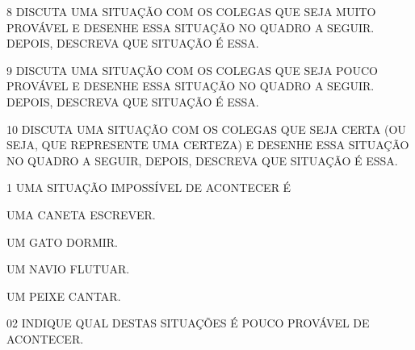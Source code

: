 \num{8} DISCUTA UMA SITUAÇÃO COM OS COLEGAS QUE SEJA MUITO PROVÁVEL E DESENHE
ESSA SITUAÇÃO NO QUADRO A SEGUIR. DEPOIS, DESCREVA QUE SITUAÇÃO É ESSA.



\num{9} DISCUTA UMA SITUAÇÃO COM OS COLEGAS QUE SEJA POUCO PROVÁVEL E DESENHE
ESSA SITUAÇÃO NO QUADRO A SEGUIR. DEPOIS, DESCREVA QUE SITUAÇÃO É ESSA.



\num{10} DISCUTA UMA SITUAÇÃO COM OS COLEGAS QUE SEJA CERTA (OU SEJA, QUE REPRESENTE UMA CERTEZA) E DESENHE ESSA SITUAÇÃO NO QUADRO A SEGUIR, DEPOIS, DESCREVA QUE SITUAÇÃO É ESSA.



\num{1} UMA SITUAÇÃO IMPOSSÍVEL DE ACONTECER É

\begin{escolha}
\item UMA CANETA ESCREVER.

\item UM GATO DORMIR.

\item UM NAVIO FLUTUAR.

\item UM PEIXE CANTAR.
\end{escolha}


\num{02} INDIQUE QUAL DESTAS SITUAÇÕES É POUCO PROVÁVEL DE ACONTECER.

